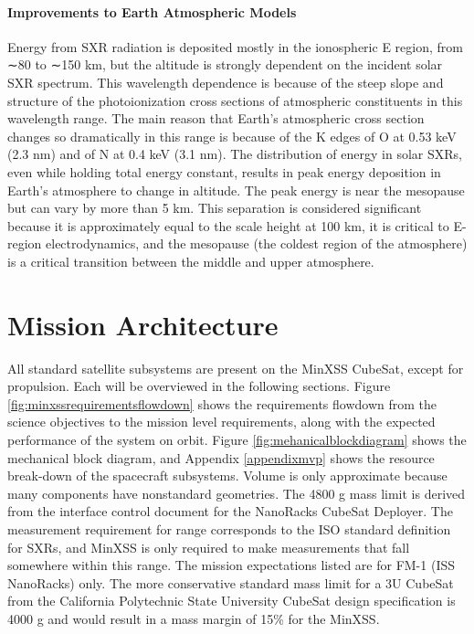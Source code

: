 \paragraph{Improvements to Earth Atmospheric Models}
Energy from SXR radiation is deposited mostly in the ionospheric E region, from ∼80 to ∼150 km, but the altitude is strongly dependent on the incident solar SXR spectrum. This wavelength dependence is because of the steep slope and structure of the photoionization cross sections of atmospheric constituents in this wavelength range. The main reason that Earth's atmospheric cross section changes so dramatically in this range is because of the K edges of O at 0.53 keV (2.3 nm) and of N at 0.4 keV (3.1 nm). The distribution of energy in solar SXRs, even while holding total energy constant, results in peak energy deposition in Earth's atmosphere to change in altitude. The peak energy is near the mesopause but can vary by more than 5 km. This separation is considered significant because it is approximately equal to the scale height at 100 km, it is critical to E-region electrodynamics, and the mesopause (the coldest region of the atmosphere) is a critical transition between the middle and upper atmosphere.

\section{Mission Architecture}
All standard satellite subsystems are present on the MinXSS CubeSat, except for propulsion. Each will be overviewed in the following sections. Figure \ref{fig:minxssrequirementsflowdown} shows the requirements flowdown from the science objectives to the mission level requirements, along with the expected performance of the system on orbit. Figure \ref{fig:mehanicalblockdiagram} shows the mechanical block diagram, and Appendix \ref{appendixmvp} shows the resource break-down of the spacecraft subsystems. Volume is only approximate because many components have nonstandard geometries. The 4800 g mass limit is derived from the interface control document for the NanoRacks CubeSat Deployer. The measurement requirement for range corresponds to the ISO standard definition for SXRs, and MinXSS is only required to make measurements that fall somewhere within this range. The mission expectations listed are for FM-1 (ISS NanoRacks) only. The more conservative standard mass limit for a 3U CubeSat from the California Polytechnic State University CubeSat design specification is 4000 g and would result in a mass margin of 15\% for the MinXSS.

